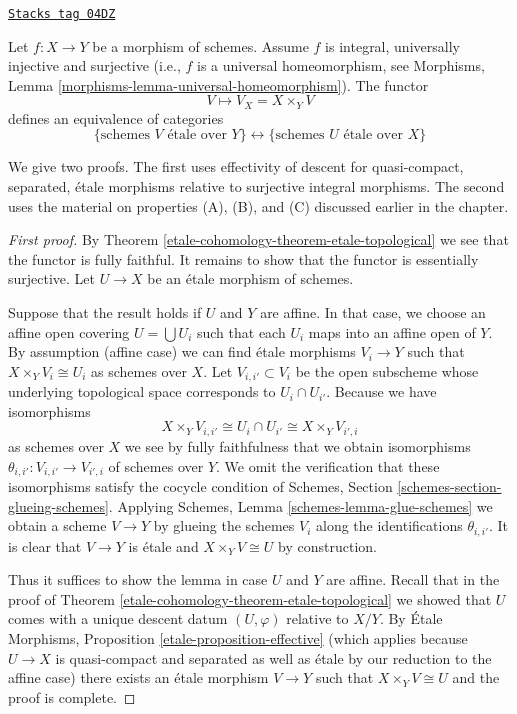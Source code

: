 \begin{theorem}
\label{etale-cohomology-theorem-topological-invariance}
\href{https://stacks.math.columbia.edu/tag/04DZ}{\texttt{Stacks tag 04DZ}}

\begin{reference}
\cite[IV Theorem 18.1.2]{EGA}
\end{reference}
Let $f : X \to Y$ be a morphism of schemes.
Assume $f$ is integral, universally injective and surjective
(i.e., $f$ is a universal homeomorphism, see
Morphisms, Lemma \ref{morphisms-lemma-universal-homeomorphism}).
The functor
$$
V \longmapsto V_X = X \times_Y V
$$
defines an equivalence of categories
$$
\{
\text{schemes }V\text{ \'etale over }Y
\}
\leftrightarrow
\{
\text{schemes }U\text{ \'etale over }X
\}
$$
\end{theorem}

We give two proofs. The first uses effectivity of descent
for quasi-compact, separated, \'etale morphisms relative
to surjective integral morphisms. The second uses the material
on properties (A), (B), and (C) discussed earlier in the chapter.

\begin{proof}[First proof]
By Theorem \ref{etale-cohomology-theorem-etale-topological}
we see that the functor is fully faithful.
It remains to show that the functor is essentially surjective.
Let $U \to X$ be an \'etale morphism of schemes.

\medskip\noindent
Suppose that the result holds if $U$ and $Y$ are affine.
In that case, we choose an affine open covering
$U = \bigcup U_i$ such that each $U_i$ maps
into an affine open of $Y$. By assumption (affine case) we can
find \'etale morphisms $V_i \to Y$ such that $X \times_Y V_i \cong U_i$
as schemes over $X$. Let $V_{i, i'} \subset V_i$
be the open subscheme whose underlying topological space
corresponds to $U_i \cap U_{i'}$. Because we have isomorphisms
$$
X \times_Y V_{i, i'} \cong U_i \cap U_{i'} \cong X \times_Y V_{i', i}
$$
as schemes over $X$ we see by fully faithfulness that we
obtain isomorphisms
$\theta_{i, i'} : V_{i, i'} \to V_{i', i}$ of schemes over $Y$.
We omit the verification that these isomorphisms satisfy the
cocycle condition of Schemes, Section \ref{schemes-section-glueing-schemes}.
Applying Schemes, Lemma \ref{schemes-lemma-glue-schemes}
we obtain a scheme $V \to Y$ by
glueing the schemes $V_i$ along the identifications $\theta_{i, i'}$.
It is clear that $V \to Y$ is \'etale and $X \times_Y V \cong U$
by construction.

\medskip\noindent
Thus it suffices to show the lemma in case $U$ and $Y$ are affine.
Recall that in the proof of Theorem \ref{etale-cohomology-theorem-etale-topological}
we showed that $U$ comes with a unique descent datum
$(U, \varphi)$ relative to $X/Y$. By
\'Etale Morphisms, Proposition \ref{etale-proposition-effective}
(which applies because $U \to X$ is quasi-compact and separated
as well as \'etale by our reduction to the affine case)
there exists an \'etale morphism $V \to Y$ such that
$X \times_Y V \cong U$ and the proof is complete.
\end{proof}

